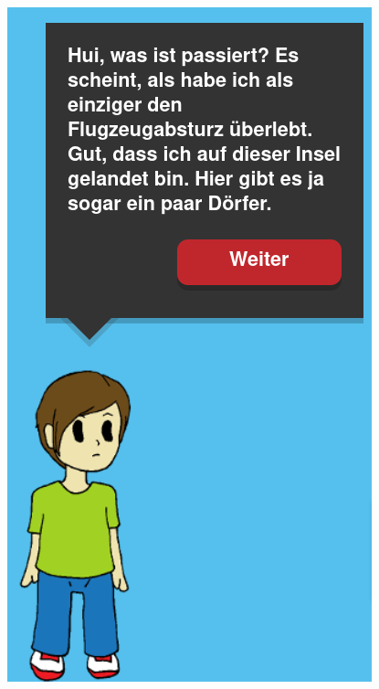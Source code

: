 \documentclass[
  letterpaper,
  DIV=11,
  numbers=noendperiod]{scrartcl}
\begin{document}
\begin{figure}

{\centering 

\href{https://sql-island.informatik.uni-kl.de/}{\includegraphics{sql_island.png}}

}

\end{figure}
\end{document}
